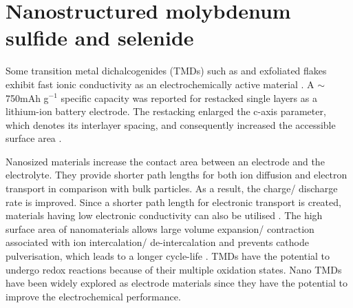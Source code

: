 \section{Nanostructured molybdenum sulfide and selenide}
Some transition metal dichalcogenides (TMDs) such as  and exfoliated  flakes exhibit fast ionic conductivity as an electrochemically active material \cite{du_superior_2010,whittingham_electrical_1976}. A $\sim$750mAh g$^{-1}$ specific capacity was reported for restacked  single layers as a lithium-ion battery electrode. The restacking enlarged the c-axis parameter, which denotes its interlayer spacing, and consequently increased the accessible surface area \cite{ammundsen_novel_2001}.

Nanosized materials increase the contact area between an electrode and the electrolyte. They provide shorter path lengths for both ion diffusion and electron transport in comparison with bulk particles. As a result, the charge/ discharge rate is improved. Since a shorter path length for electronic transport is created, materials having low electronic conductivity can also be utilised \cite{pitchai_nanostructured_2011}. The high surface area of nanomaterials allows large volume expansion/ contraction associated with ion intercalation/ de-intercalation and prevents cathode pulverisation, which leads to a longer cycle-life \cite{zhang_ultrathin_2015, cong_intrinsic_2015}. TMDs have the potential to undergo redox reactions because of their multiple oxidation states. Nano TMDs have been widely explored as electrode materials since they have the potential to improve the electrochemical performance. 
